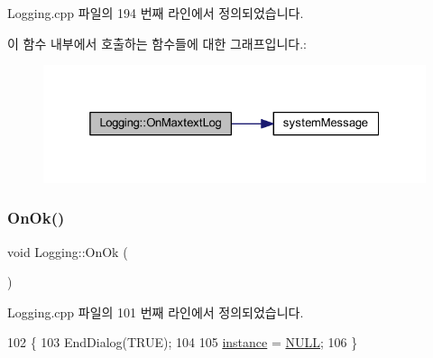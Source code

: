 Logging.\+cpp 파일의 194 번째 라인에서 정의되었습니다.


이 함수 내부에서 호출하는 함수들에 대한 그래프입니다.\+:
\nopagebreak
\begin{figure}[H]
\begin{center}
\leavevmode
\includegraphics[width=325pt]{class_logging_a4d292fcd815e0ea21894c4ff08b4a4f8_cgraph}
\end{center}
\end{figure}
\mbox{\label{class_logging_a65ef606af9b874a580b1845405414e3d}} 
\subsubsection{\texorpdfstring{On\+Ok()}{OnOk()}}
{\footnotesize\ttfamily void Logging\+::\+On\+Ok (\begin{DoxyParamCaption}{ }\end{DoxyParamCaption})\hspace{0.3cm}{\ttfamily [protected]}}



Logging.\+cpp 파일의 101 번째 라인에서 정의되었습니다.


\begin{DoxyCode}
102 \{
103   EndDialog(TRUE);
104 
105   \mbox{\hyperlink{class_logging_abbc7b283056098e51d9791175abbdc23}{instance}} = \mbox{\hyperlink{getopt1_8c_a070d2ce7b6bb7e5c05602aa8c308d0c4}{NULL}};
106 \}
\end{DoxyCode}
\mbox{\label{class_logging_ae00d039caa8724e18442bb7beaf8457c}} 
